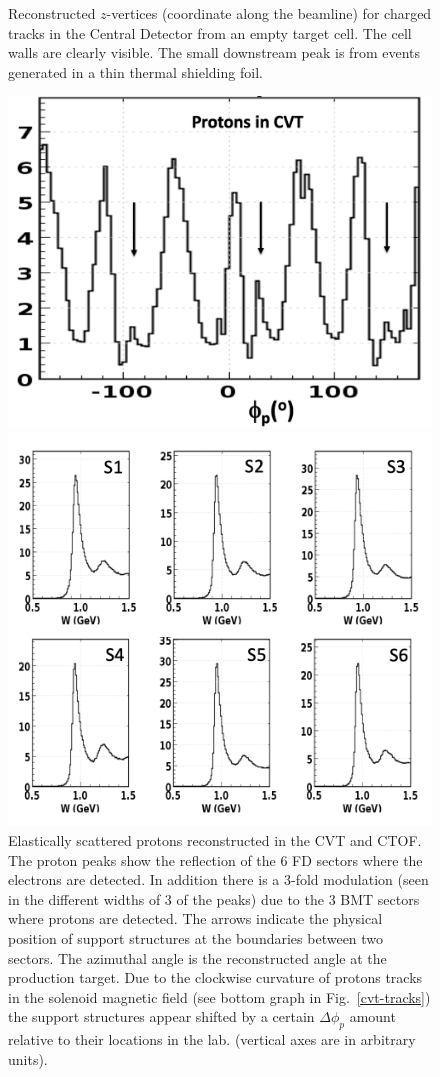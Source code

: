\documentclass[final,3p,twocolumn]{elsarticle}
\begin{document}
\begin{figure}[t!]
\caption{Reconstructed $z$-vertices (coordinate along the beamline) for charged tracks in the Central Detector
  from an empty target cell. The cell walls are clearly visible. The small downstream peak is from events generated
  in a thin thermal shielding foil.}
\label{cvt-vertex}
\end{figure}
\begin{figure}[t!]
\centerline{\includegraphics[width=0.8\columnwidth]{CVT-elastic-protons.png}}
\caption{Elastically scattered protons reconstructed in the CVT and CTOF. The proton peaks show the reflection of
  the 6 FD sectors where the electrons are detected. In addition there is a 3-fold modulation (seen in the different
  widths of 3 of the peaks) due to the 3 BMT sectors where protons are detected. The arrows indicate the physical 
  position of support structures at the boundaries between two sectors. The azimuthal angle is the reconstructed angle 
  at the production target. Due to the clockwise curvature of protons tracks in the solenoid magnetic field 
  (see bottom graph in Fig.~\ref{cvt-tracks}) the support structures appear shifted by a certain $\Delta{\phi_p}$  
  amount relative to their locations in the lab. (vertical axes are in arbitrary units).}
\label{CVT-elastic-protons}
\centerline{\includegraphics[width=0.9\columnwidth]{elastic-electrons.png}}

\end{figure}
\end{document}
